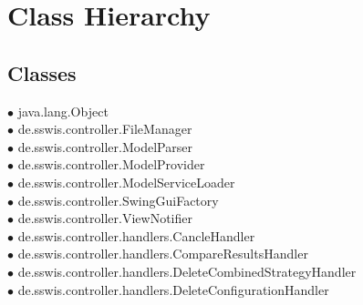 \section{Class Hierarchy}{

\subsection{Classes}
{\raggedright
\hspace{0.0cm} $\bullet$ java.lang.Object {\tiny {}} \\
\hspace{1.0cm} $\bullet$ de.sswis.controller.FileManager {\tiny {}} \\
\hspace{1.0cm} $\bullet$ de.sswis.controller.ModelParser {\tiny {}} \\
\hspace{1.0cm} $\bullet$ de.sswis.controller.ModelProvider {\tiny {}} \\
\hspace{1.0cm} $\bullet$ de.sswis.controller.ModelServiceLoader {\tiny {}} \\
\hspace{1.0cm} $\bullet$ de.sswis.controller.SwingGuiFactory {\tiny {}} \\
\hspace{1.0cm} $\bullet$ de.sswis.controller.ViewNotifier {\tiny {}} \\
\hspace{1.0cm} $\bullet$ de.sswis.controller.handlers.CancleHandler {\tiny {}} \\
\hspace{1.0cm} $\bullet$ de.sswis.controller.handlers.CompareResultsHandler {\tiny {}} \\
\hspace{1.0cm} $\bullet$ de.sswis.controller.handlers.DeleteCombinedStrategyHandler {\tiny {}} \\
\hspace{1.0cm} $\bullet$ de.sswis.controller.handlers.DeleteConfigurationHandler {\tiny {}} \\
}}
